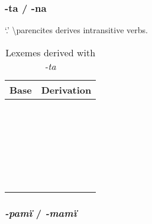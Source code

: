 \documentclass{memoir}
\begin{document}
\subsubsection{\texorpdfstring{-ta / -na \label{sec:tavbz}}{-ta / -na }}

 `.' \textbackslash parencites derives
intransitive verbs.

\begin{table}
\caption{Lexemes derived with \emph{-ta}}
\label{tab:tavbz}
\centering
\begin{tabular}{ll}
\toprule
Base & Derivation \\
\midrule
     &            \\
     &            \\
     &            \\
     &            \\
     &            \\
     &            \\
     &            \\
     &            \\
     &            \\
     &            \\
     &            \\
     &            \\
     &            \\
     &            \\
     &            \\
     &            \\
     &            \\
     &            \\
     &            \\
     &            \\
     &            \\
     &            \\
     &            \\
     &            \\
     &            \\
     &            \\
\bottomrule
\end{tabular}

\end{table}

\subsubsection{\texorpdfstring{\emph{-pamï} /
\emph{-mamï}}{-pamï / -mamï}}
\end{document}
